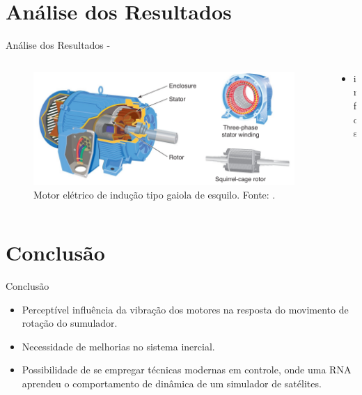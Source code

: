 \documentclass[aspectratio=169]{beamer}
\begin{document}
\section{Análise dos Resultados}
\begin{frame}{Análise dos Resultados - }
	\begin{columns}
    	\begin{column}{0.50\textwidth}
			\begin{figure}[HT]
				\begin{center}
				\includegraphics[scale=.25]{../referencial/img/ind_motor_petruzella_p115.png}
				\caption{Motor elétrico de indução tipo gaiola de esquilo. \newline
				Fonte: .}
				\label{fig:ind_motor_petruzella_p115}
				\end{center}
			\end{figure}
     	\end{column}
		
		\begin{column}{0.5\textwidth}
			\begin{itemize}
				\item infos
			\end{itemize}
	 	\end{column}
	 \end{columns}
\end{frame}


\section{Conclusão}
	\begin{frame}{Conclusão}
    \begin{itemize}
        	\justifying
			\item Perceptível influência da vibração dos motores na resposta do movimento de rotação do sumulador.
			\item Necessidade de melhorias no sistema inercial.
			\item Possibilidade de se empregar técnicas modernas em controle, onde uma RNA aprendeu o comportamento de dinâmica de um simulador de satélites.
		\end{itemize}
\end{frame}
\end{document}
